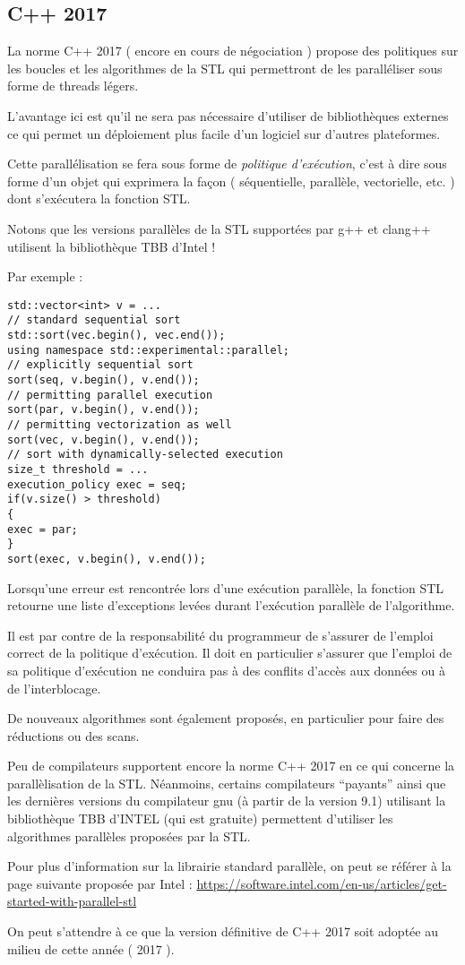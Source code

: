 \documentclass[fleqn,11pt]{article}
\begin{document}
\subsection{C++ 2017}

La norme C++ 2017 ( encore en cours de négociation ) propose des politiques sur les boucles
et les algorithmes de la STL qui permettront de les paralléliser sous forme de threads légers.

L'avantage ici est qu'il ne sera pas nécessaire d'utiliser de bibliothèques externes ce qui permet un
déploiement plus facile d'un logiciel sur d'autres plateformes.

Cette parallélisation se fera sous forme de \textsl{politique d'exécution}, c'est à dire sous
forme d'un objet qui exprimera la façon ( séquentielle, parallèle, vectorielle, etc. ) dont
s'exécutera la fonction STL.

Notons que les versions parallèles de la STL supportées par g++ et clang++ utilisent la bibliothèque TBB
d'Intel !

Par exemple :
\begin{lstlisting}
std::vector<int> v = ...
// standard sequential sort
std::sort(vec.begin(), vec.end());
using namespace std::experimental::parallel;
// explicitly sequential sort
sort(seq, v.begin(), v.end());
// permitting parallel execution
sort(par, v.begin(), v.end());
// permitting vectorization as well
sort(vec, v.begin(), v.end());
// sort with dynamically-selected execution
size_t threshold = ...
execution_policy exec = seq;
if(v.size() > threshold)
{
exec = par;
}
sort(exec, v.begin(), v.end());
\end{lstlisting}

Lorsqu'une erreur est rencontrée lors d'une exécution parallèle, la fonction STL retourne
une liste d'exceptions levées durant l'exécution parallèle de l'algorithme.

Il est par contre de la responsabilité du programmeur de s'assurer de l'emploi correct de la politique
d'exécution. Il doit en particulier s'assurer que l'emploi de sa politique d'exécution ne conduira pas
à des conflits d'accès aux données ou à de l'interblocage.

De nouveaux algorithmes sont également proposés, en particulier pour faire des réductions ou des
scans.

Peu de compilateurs supportent encore la norme C++ 2017 en ce qui concerne la parallèlisation de la STL.
Néanmoins, certains compilateurs ``payants'' ainsi que les dernières versions du compilateur gnu (à partir de la version 9.1)
utilisant la bibliothèque TBB d'INTEL (qui est gratuite)  permettent d'utiliser les algorithmes parallèles
proposées par la STL. 

Pour plus d'information sur la librairie standard parallèle, on peut se référer à la page suivante proposée
par Intel :
\url{https://software.intel.com/en-us/articles/get-started-with-parallel-stl}


On peut s'attendre à ce que la version définitive de C++ 2017 soit adoptée au milieu
de cette année ( 2017 ).
\end{document}
